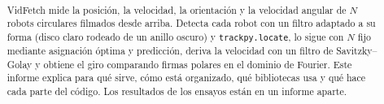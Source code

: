 \documentclass[11pt, a4paper]{article}
\title{\TituloAplicacion\\[2pt]\large \SubtituloAplicacion}
\author{\Autores \\ \small \Institucion}
\date{\FechaInforme}
\begin{document}
\maketitle

\begin{abstract}
\noindent VidFetch mide la posición, la velocidad, la orientación y la velocidad angular de $N$ robots
circulares filmados desde arriba. Detecta cada robot con un filtro adaptado a su forma (disco claro
rodeado de un anillo oscuro) y \texttt{trackpy.locate}, lo sigue con $N$ fijo mediante asignación
óptima y predicción, deriva la velocidad con un filtro de Savitzky--Golay y obtiene el giro comparando
firmas polares en el dominio de Fourier. Este informe explica para qué sirve, cómo está organizado,
qué bibliotecas usa y qué hace cada parte del código. Los resultados de los ensayos están en un
informe aparte.
\end{abstract}

\newpage
\tableofcontents
\newpage






\end{document}
